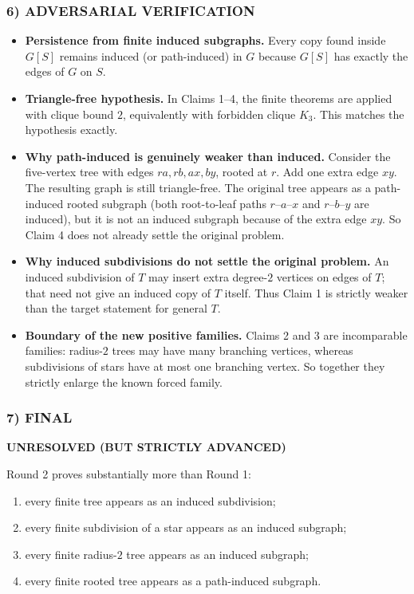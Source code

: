 \subsubsection*{6) ADVERSARIAL VERIFICATION}
\begin{itemize}
\item \textbf{Persistence from finite induced subgraphs.} Every copy found inside $G[S]$ remains induced (or path-induced) in $G$ because $G[S]$ has exactly the edges of $G$ on $S$.
\item \textbf{Triangle-free hypothesis.} In Claims 1--4, the finite theorems are applied with clique bound $2$, equivalently with forbidden clique $K_3$. This matches the hypothesis exactly.
\item \textbf{Why path-induced is genuinely weaker than induced.} Consider the five-vertex tree with edges $ra, rb, ax, by$, rooted at $r$. Add one extra edge $xy$. The resulting graph is still triangle-free. The original tree appears as a path-induced rooted subgraph (both root-to-leaf paths $r$--$a$--$x$ and $r$--$b$--$y$ are induced), but it is not an induced subgraph because of the extra edge $xy$. So Claim 4 does not already settle the original problem.
\item \textbf{Why induced subdivisions do not settle the original problem.} An induced subdivision of $T$ may insert extra degree-$2$ vertices on edges of $T$; that need not give an induced copy of $T$ itself. Thus Claim 1 is strictly weaker than the target statement for general $T$.
\item \textbf{Boundary of the new positive families.} Claims 2 and 3 are incomparable families: radius-$2$ trees may have many branching vertices, whereas subdivisions of stars have at most one branching vertex. So together they strictly enlarge the known forced family.
\end{itemize}

\subsubsection*{7) FINAL}
\textbf{UNRESOLVED (BUT STRICTLY ADVANCED)}

Round 2 proves substantially more than Round 1:

\begin{enumerate}
\item every finite tree appears as an induced subdivision;
\item every finite subdivision of a star appears as an induced subgraph;
\item every finite radius-$2$ tree appears as an induced subgraph;
\item every finite rooted tree appears as a path-induced subgraph.
\end{enumerate}

